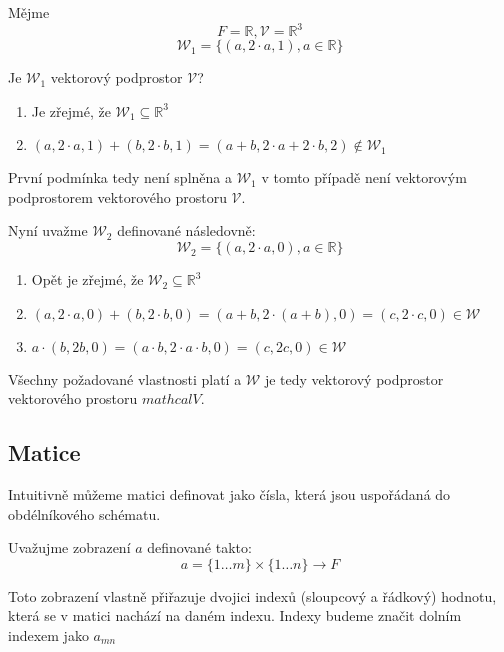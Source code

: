 \begin{example}
    Mějme
    $$F = \mathbb{R}, \mathcal{V} = \mathbb{R}^3$$
    $$\mathcal{W}_1 = \{(a, 2\cdot a, 1), a \in \mathbb{R}\}$$

    Je $\mathcal{W}_1$ vektorový podprostor $\mathcal{V}$?
    \begin{enumerate}[start=0]
        \item Je zřejmé, že $\mathcal{W}_1 \subseteq \mathbb{R}^3$
        \item $(a, 2 \cdot a, 1) + (b, 2 \cdot b, 1) = (a + b, 2 \cdot a + 2 \cdot b, 2)
        \notin \mathcal{W}_1$
    \end{enumerate}
    První podmínka tedy není splněna a $\mathcal{W}_1$ v tomto případě není vektorovým podprostorem
    vektorového prostoru $\mathcal{V}$.

    Nyní uvažme $\mathcal{W}_2$ definované následovně:
    $$\mathcal{W}_2 = \{(a, 2\cdot a, 0), a \in \mathbb{R}\}$$
    \begin{enumerate}[start=0]
        \item Opět je zřejmé, že $\mathcal{W}_2 \subseteq \mathbb{R}^3$
        \item $(a, 2 \cdot a, 0) + (b, 2 \cdot b, 0) = (a + b, 2 \cdot (a + b), 0) = (c, 2 \cdot c, 0) \in \mathcal{W}$
        \item $a \cdot (b, 2b, 0) = (a \cdot b, 2\cdot a \cdot b, 0) = (c, 2c, 0) \in \mathcal{W}$
    \end{enumerate}
    Všechny požadované vlastnosti platí a $\mathcal{W}$ je tedy vektorový podprostor vektorového
    prostoru $mathcal{V}$.
\end{example}

\subsection{Matice}

Intuitivně můžeme matici definovat jako čísla, která jsou uspořádaná do obdélníkového schématu.

\begin{definition}[Matice]
    Uvažujme zobrazení $a$ definované takto:
    $$a = \{1 \ldots m\} \times \{1 \ldots n\} \rightarrow F$$

    Toto zobrazení vlastně přiřazuje dvojici indexů (sloupcový a řádkový) hodnotu,
    která se v matici nachází na daném indexu. Indexy budeme značit dolním indexem
    jako $a_{mn}$
\end{definition}

